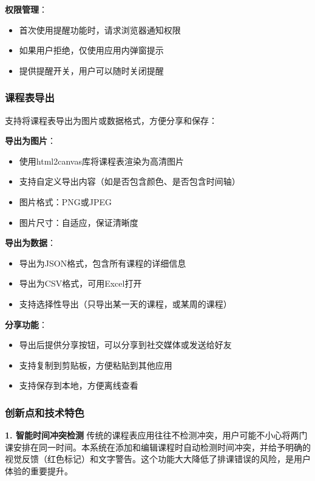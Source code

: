 \documentclass[12pt,a4paper]{article}
\begin{document}
\textbf{权限管理}：
\begin{itemize}
    \item 首次使用提醒功能时，请求浏览器通知权限
    \item 如果用户拒绝，仅使用应用内弹窗提示
    \item 提供提醒开关，用户可以随时关闭提醒
\end{itemize}

\subsubsection{课程表导出}

支持将课程表导出为图片或数据格式，方便分享和保存：

\textbf{导出为图片}：
\begin{itemize}
    \item 使用html2canvas库将课程表渲染为高清图片
    \item 支持自定义导出内容（如是否包含颜色、是否包含时间轴）
    \item 图片格式：PNG或JPEG
    \item 图片尺寸：自适应，保证清晰度
\end{itemize}

\textbf{导出为数据}：
\begin{itemize}
    \item 导出为JSON格式，包含所有课程的详细信息
    \item 导出为CSV格式，可用Excel打开
    \item 支持选择性导出（只导出某一天的课程，或某周的课程）
\end{itemize}

\textbf{分享功能}：
\begin{itemize}
    \item 导出后提供分享按钮，可以分享到社交媒体或发送给好友
    \item 支持复制到剪贴板，方便粘贴到其他应用
    \item 支持保存到本地，方便离线查看
\end{itemize}

\subsubsection{创新点和技术特色}

\textbf{1. 智能时间冲突检测}
传统的课程表应用往往不检测冲突，用户可能不小心将两门课安排在同一时间。本系统在添加和编辑课程时自动检测时间冲突，并给予明确的视觉反馈（红色标记）和文字警告。这个功能大大降低了排课错误的风险，是用户体验的重要提升。
\end{document}
